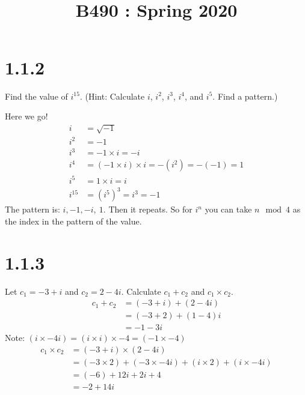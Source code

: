 \documentclass[11pt]{article}
\title{
    \vspace{2in}
    \textmd{\textbf{\tit}}\\
    \normalsize\vspace{0.1in}\small{B490 : Spring 2020 }\\
    \vspace{0.1in}\large{\textit{\auths}}
    \vspace{3in}
}
\date{}
\begin{document}
\maketitle
\pagebreak



\section{1.1.2}
Find the value of $i^{15}$. (Hint: Calculate $i$, $i^2$, $i^3$, $i^4$, and $i^5$. Find a pattern.) 

Here we go! 
\begin{align*}
	i &= \sqrt{-1} \\
	i^2 &= -1  \\
	i^3 &= -1 \times i = -i \\
	i^4 &= (-1 \times i) \times i = -(i^2) = -(-1) = 1 \\
	i^5 &= 1 \times i = i \\
	i^{15} &= (i^5)^3 = i^3 = -1 
\end{align*}
The pattern is: $i, -1, -i,\ 1$. Then it repeats. So for $i^n$ you can take $n \mod 4$ as the index in the pattern of the value.


\section{1.1.3}
Let $c_1 = -3 + i$ and $c_2 = 2 - 4i$. Calculate $c_1 + c_2$ and $c_1 \times c_2$. 
\begin{align*} 
	c_1 + c_2 &= (-3 + i) + (2 - 4i)  \\
	          &= (-3 + 2) + (1 - 4)i  \\
		  &= -1 - 3i
\end{align*}
Note: $(i \times -4i) = (i \times i) \times -4 = (-1 \times -4)$ 
\begin{align*}
	c_1 \times c_2 &= (-3 + i) \times (2 - 4i) \\
		       &= (-3 \times 2) + (-3 \times -4i)  + (i \times 2) + (i \times -4i)  \\
		       &= (-6) + 12i + 2i + 4  \\
		       &= -2 + 14i
\end{align*}
\end{document}
